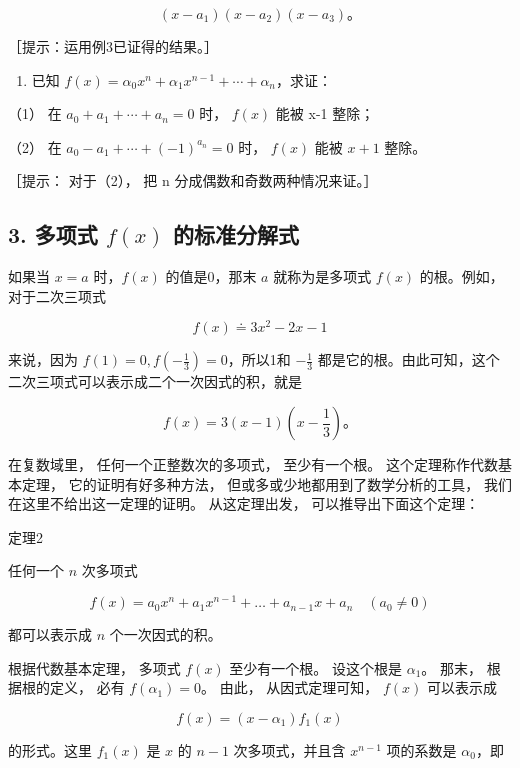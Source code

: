 \[
(x - a _ {1}) (x - a _ {2}) (x - a _ {3})\text{。}
\]

［提示：运用例3已证得的结果。］

\begin{enumerate}[start=4]
\item
  已知
  \(f(x) = \alpha_0 x^n + \alpha_1 x^{n-1} + \cdots + \alpha_n\)，求证：
\end{enumerate}

（1） 在 \(a_{0}+a_{1}+\cdots+a_{n}=0\) 时， \(f(x)\) 能被 x-1 整除；

（2） 在 \(a_{0}-a_{1}+\cdots+(-1)^{a_{n}}=0\) 时， \(f(x)\) 能被
\(x+1\) 整除。

［提示： 对于（2）， 把 n 分成偶数和奇数两种情况来证。］

\subsection{\texorpdfstring{3. 多项式 \(f(x)\) 的标准分解式}{3. 多项式 f(x) 的标准分解式}}

如果当 \(x = a\) 时，\(f(x)\) 的值是0，那末 \(a\) 就称为是多项式
\(f(x)\) 的根。例如，对于二次三项式

\[
f (x) \doteq 3 x ^ {2} - 2 x - 1
\]

来说，因为 \(f(1) = 0, f\left(-\frac{1}{3}\right) = 0\)，所以1和
\(-\frac{1}{3}\)
都是它的根。由此可知，这个二次三项式可以表示成二个一次因式的积，就是

\[
f (x) = 3 (x - 1) \left(x - \frac {1}{3}\right)\text{。}
\]

在复数域里， 任何一个正整数次的多项式， 至少有一个根。
这个定理称作代数基本定理， 它的证明有好多种方法，
但或多或少地都用到了数学分析的工具， 我们在这里不给出这一定理的证明。
从这定理出发， 可以推导出下面这个定理：

定理2

任何一个 \(n\) 次多项式

\[
f (x) = a _ {0} x ^ {n} + a _ {1} x ^ {n - 1} + \dots + a _ {n - 1} x + a _ {n} \quad (a _ {0} \neq 0)
\]

都可以表示成 \(n\) 个一次因式的积。


根据代数基本定理， 多项式 \(f(x)\) 至少有一个根。 设这个根是
\(\alpha_{1}\)。 那末， 根据根的定义， 必有 \(f(\alpha_{1}) = 0\)。
由此， 从因式定理可知， \(f(x)\) 可以表示成

\[
f (x) = (x - \alpha_ {1}) f _ {1} (x) \tag {1}
\]

的形式。这里 \(f_{1}(x)\) 是 \(x\) 的 \(n - 1\) 次多项式，并且含
\(x^{n - 1}\) 项的系数是 \(\alpha_0\)，即

